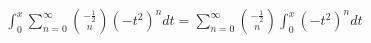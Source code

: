 \documentclass[preview]{standalone}
\begin{document}
\begin{align*}
\int_{0}^{x} \sum_{n=0}^{\infty} \binom{-\frac{1}{2}}{n} (-t^2)^n dt = \sum_{n=0}^{\infty} \binom{-\frac{1}{2}}{n} \int_{0}^{x} (-t^2)^n dt
\end{align*}
\end{document}
